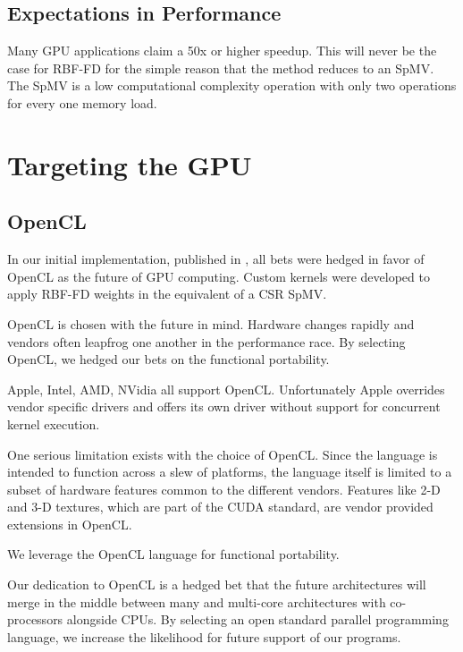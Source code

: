 \documentclass{report}
\begin{document}
\subsection{Expectations in Performance}
Many GPU applications claim a 50x or higher speedup. This will never be the case for RBF-FD for the simple reason that the method reduces to an SpMV. The SpMV is a low computational complexity operation with only two operations for every one memory load. 



\section{Targeting the GPU}

\subsection{OpenCL}
In our initial implementation, published in \cite{BolligFlyerErlebacher2012}, all bets were hedged in favor of OpenCL as the future of GPU computing. Custom kernels were developed to apply RBF-FD weights in the equivalent of a CSR SpMV. 

OpenCL is chosen with the future in mind. Hardware changes rapidly and vendors often leapfrog one another in the performance race. By selecting OpenCL, we hedged our bets on the functional portability. 

Apple, Intel, AMD, NVidia all support OpenCL.  Unfortunately Apple overrides vendor specific drivers and offers its own driver without support for concurrent kernel execution. 

One serious limitation exists with the choice of OpenCL. Since the language is intended to function across a slew of platforms, the language itself is limited to a subset of hardware features common to the different vendors. Features like 2-D and 3-D textures, which are part of the CUDA standard, are vendor provided extensions in OpenCL. 

We leverage the OpenCL language for functional portability. 

Our dedication to OpenCL is a hedged bet that the future architectures will merge in the middle between many and multi-core architectures with co-processors alongside CPUs. By selecting an open standard parallel programming language, we increase the likelihood for future support of our programs. 
\end{document}
